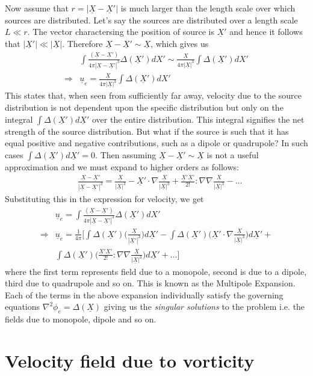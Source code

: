 \documentclass[11pt,a4paper]{article}
\newcommand{\vect}[1]{\underline{#1}}
\newcommand{\1}{\vect{1}}
\newcommand{\grad}{\nabla}
\newcommand{\RA}{\Rightarrow}
\newcommand{\DX}{\Delta(\vect X)}
\newcommand{\DXp}{\Delta(\vect X')}
\newcommand{\X}{\vect X}
\newcommand{\Xp}{\vect X'}
\begin{document}
Now assume that $r=|\vect X - \vect X'|$ is much larger than the length scale over which sources are distributed. Let's say the sources are distributed over a length scale $L \ll r$. The vector charactersing the position of source is $\vect X'$ and hence it follows that $|\vect X'|\ll|\vect X|$. Therefore $\vect X - \vect X' \sim \vect X$, which gives us
\begin{align*}
&\int\frac{(\vect X - \vect X')}{4\pi|\vect X - \vect X'|^3}\DXp dX' \sim  \frac{\vect X}{4\pi|\vect X|^3}\int\DXp dX'\\
\RA& \vect u_e = \frac{\vect X}{4\pi|\vect X|^3}\int\DXp dX'
\end{align*}
This states that, when seen from sufficiently far away, velocity due to the source distribution is not dependent upon the specific distribution but only on the integral $\int \DXp d\vect X'$ over the entire distribution. This integral signifies the net strength of the source distribution. But what if the source is such that it has equal positive and negative contributions, such as a dipole or quadrupole? In such cases $\int \DXp d\vect X' = 0$. Then assuming $\vect X - \vect X' \sim \vect X$ is not a useful approximation and we must expand to higher orders as follows:
\begin{align*}
&\frac{\X - \Xp}{|\X - \Xp|^3} = \frac{\X}{|\X|^3} - \Xp\cdot\grad\frac{\X}{|\X|^3} + \frac{\Xp\Xp}{2!}:\grad\grad\frac{\X}{|\X|^3} - ...
\end{align*}
Substituting this in the expression for velocity, we get
\begin{align*}
&\vect u_e = \int\frac{(\vect X - \vect X')}{4\pi|\vect X - \vect X'|^3}\DXp dX'\\
\RA& \vect u_e = \frac{1}{4\pi} \bigg[ \int \DXp \bigg(\frac{\X}{|\Xp|^3}\bigg) d\vect X' - \int \DXp \bigg(\Xp\cdot\grad\frac{\X}{|\X|^3}\bigg) d\vect X'+ \\ &\int \DXp \bigg(\frac{\Xp\Xp}{2!}:\grad\grad\frac{\X}{|\X|^3}\bigg) d\vect X' + ... \bigg]
\end{align*}
where the first term represents field due to a monopole, second is due to a dipole, third due to quadrupole and so on. This is known as the Multipole Expansion. Each of the terms in the above expansion individually satisfy the governing equations $\grad^2 \phi_e = \DX$ giving us the \textit{singular solutions} to the problem i.e. the fields due to monopole, dipole and so on.

\section{Velocity field due to vorticity}
\end{document}
